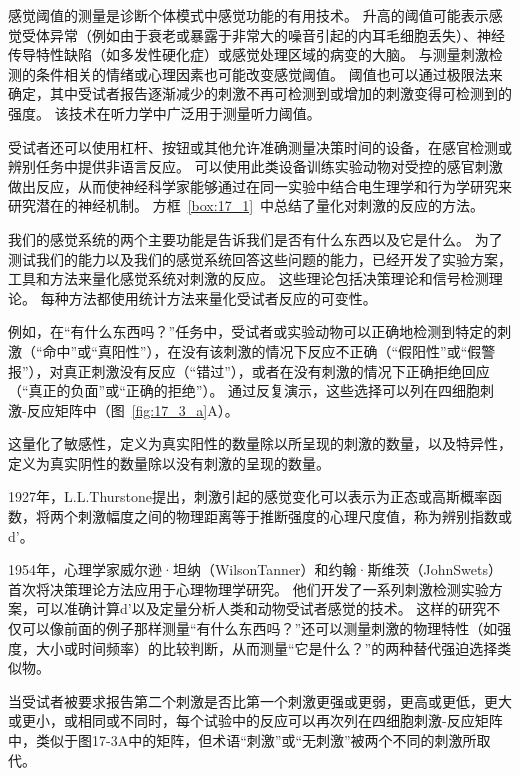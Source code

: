 感觉阈值的测量是诊断个体模式中感觉功能的有用技术。 
升高的阈值可能表示感觉受体异常（例如由于衰老或暴露于非常大的噪音引起的内耳毛细胞丢失）、神经传导特性缺陷（如多发性硬化症）或感觉处理区域的病变的大脑。
与测量刺激检测的条件相关的情绪或心理因素也可能改变感觉阈值。
阈值也可以通过极限法来确定，其中受试者报告逐渐减少的刺激不再可检测到或增加的刺激变得可检测到的强度。
该技术在听力学中广泛用于测量听力阈值。


受试者还可以使用杠杆、按钮或其他允许准确测量决策时间的设备，在感官检测或辨别任务中提供非语言反应。 
可以使用此类设备训练实验动物对受控的感官刺激做出反应，从而使神经科学家能够通过在同一实验中结合电生理学和行为学研究来研究潜在的神经机制。
方框~\ref{box:17_1}~中总结了量化对刺激的反应的方法。


\begin{proposition} \label{box:17_1}
	
	\quad \quad 我们的感觉系统的两个主要功能是告诉我们是否有什么东西以及它是什么。
	为了测试我们的能力以及我们的感觉系统回答这些问题的能力，已经开发了实验方案，工具和方法来量化感觉系统对刺激的反应。
	这些理论包括决策理论和信号检测理论。
	每种方法都使用统计方法来量化受试者反应的可变性。
	
	\quad \quad 例如，在“有什么东西吗？”任务中，受试者或实验动物可以正确地检测到特定的刺激（“命中”或“真阳性”），在没有该刺激的情况下反应不正确（“假阳性”或“假警报”），对真正刺激没有反应（“错过”），或者在没有刺激的情况下正确拒绝回应（“真正的负面”或“正确的拒绝”）。
	通过反复演示，这些选择可以列在四细胞刺激-反应矩阵中（图~\ref{fig:17_3_a}A）。
	
	\quad \quad 这量化了敏感性，定义为真实阳性的数量除以所呈现的刺激的数量，以及特异性，定义为真实阴性的数量除以没有刺激的呈现的数量。
	
	\quad \quad 1927年，L.L.Thurstone提出，刺激引起的感觉变化可以表示为正态或高斯概率函数，将两个刺激幅度之间的物理距离等于推断强度的心理尺度值，称为辨别指数或d'。
	
	\quad \quad 1954年，心理学家威尔逊·坦纳（WilsonTanner）和约翰·斯维茨（JohnSwets）首次将决策理论方法应用于心理物理学研究。
	他们开发了一系列刺激检测实验方案，可以准确计算d'以及定量分析人类和动物受试者感觉的技术。
	这样的研究不仅可以像前面的例子那样测量“有什么东西吗？”还可以测量刺激的物理特性（如强度，大小或时间频率）的比较判断，从而测量“它是什么？”的两种替代强迫选择类似物。
	
	\quad \quad 当受试者被要求报告第二个刺激是否比第一个刺激更强或更弱，更高或更低，更大或更小，或相同或不同时，每个试验中的反应可以再次列在四细胞刺激-反应矩阵中，类似于图17-3A中的矩阵，但术语“刺激”或“无刺激”被两个不同的刺激所取代。
	

\end{proposition}
